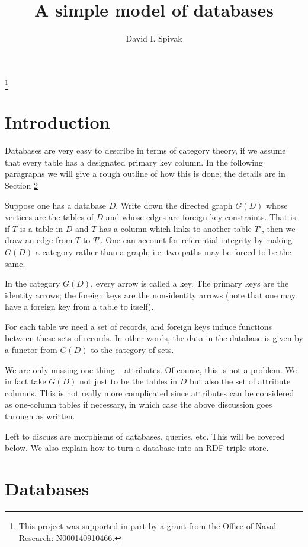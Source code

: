 \documentclass{amsart}
\theoremstyle{remark}
\theoremstyle{definition}
\begin{document}
\title{A simple model of databases}

\author{David I. Spivak}

\thanks{This project was supported in part by a grant from the Office of Naval Research: N000140910466.}

\maketitle

\section{Introduction}

Databases are very easy to describe in terms of category theory, if we assume that every table has a designated primary key column.  In the following paragraphs we will give a rough outline of how this is done; the details are in Section \ref{sec:details}

Suppose one has a database $D$.  Write down the directed graph $G(D)$ whose vertices are the tables of $D$ and whose edges are foreign key constraints.  That is if $T$ is a table in $D$ and $T$ has a column which links to another table $T'$, then we draw an edge from $T$ to $T'$.  One can account for referential integrity by making $G(D)$ a category rather than a graph; i.e. two paths may be forced to be the same.

In the category $G(D)$, every arrow is called a key.  The primary keys are the identity arrows; the foreign keys are the non-identity arrows (note that one may have a foreign key from a table to itself).  

For each table we need a set of records, and foreign keys induce functions between these sets of records.  In other words, the data in the database is given by a functor from $G(D)$ to the category of sets.

We are only missing one thing -- attributes.  Of course, this is not a problem.  We in fact take $G(D)$ not just to be the tables in $D$ but also the set of attribute columns.  This is not really more complicated since attributes can be considered as one-column tables if necessary, in which case the above discussion goes through as written.

Left to discuss are morphisms of databases, queries, etc.  This will be covered below.  We also explain how to turn a database into an RDF triple store.

\section{Databases}\label{sec:details}
\end{document}
